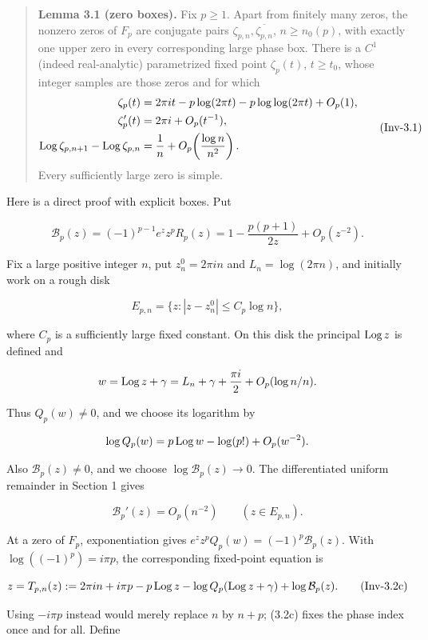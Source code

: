 \begin{quote}
\textbf{Lemma 3.1 (zero boxes).} Fix \(p\geq1\). Apart from finitely many
zeros, the nonzero zeros of \(F_p\) are conjugate pairs
\(\zeta_{p,n},\overline{\zeta_{p,n}}\), \(n\geq n_0(p)\), with exactly
one upper zero in every corresponding large phase box. There is a
\(C^1\) (indeed real-analytic) parametrized fixed point
\(\zeta_p(t)\), \(t\geq t_0\),
whose integer samples are those zeros and for which
\[
 \begin{aligned}
 \zeta_p(t)
 &=2\pi it-p\log(2\pi t)-p\log\log(2\pi t)+O_p(1),\\
 \zeta_p'(t)&=2\pi i+O_p(t^{-1}),\\
 \operatorname{Log}\zeta_{p,n+1}-\operatorname{Log}\zeta_{p,n}
 &=\frac1n+O_p\!\left(\frac{\log n}{n^2}\right).
 \end{aligned}
\tag{Inv-3.1}
\]
Every sufficiently large zero is simple.
\end{quote}

Here is a direct proof with explicit boxes. Put

\[
 \mathcal B_p(z)=(-1)^{p-1}e^z z^pR_p(z)
 =1-\frac{p(p+1)}{2z}+O_p(z^{-2}).
\]

Fix a large positive integer \(n\), put \(z_n^0=2\pi in\) and
\(L_n=\log(2\pi n)\), and initially work on a rough disk

\[
 E_{p,n}=\{z:|z-z_n^0|\leq C_p\log n\},
\tag{Inv-3.2a}
\]

where \(C_p\) is a sufficiently large fixed constant. On this disk the
principal \(\operatorname{Log} z\) is defined and

\[
 w=\operatorname{Log} z+\gamma=L_n+\gamma+\frac{\pi i}{2}
    +O_p(\log n/n).
\]

Thus \(Q_p(w)\ne0\), and we choose its logarithm by

\[
 \log Q_p(w)=p\operatorname{Log} w-\log(p!)+O_p(w^{-2}).
\]

Also \(\mathcal B_p(z)\ne0\), and we choose
\(\log \mathcal B_p(z)\to0\). The differentiated
uniform remainder in Section 1 gives

\[
 \mathcal B_p'(z)=O_p(n^{-2})\qquad (z\in E_{p,n}).
\tag{Inv-3.2b}
\]

At a zero of \(F_p\), exponentiation gives
\(e^zz^pQ_p(w)=(-1)^p\mathcal B_p(z)\). With
\(\log((-1)^p)=i\pi p\), the corresponding fixed-point equation is

\[
 z=T_{p,n}(z):=2\pi in+i\pi p-p\operatorname{Log} z
 -\log Q_p(\operatorname{Log} z+\gamma)+\log \mathcal B_p(z).
\tag{Inv-3.2c}
\]

Using \(-i\pi p\) instead would merely replace \(n\) by \(n+p\); (3.2c)
fixes the phase index once and for all. Define

